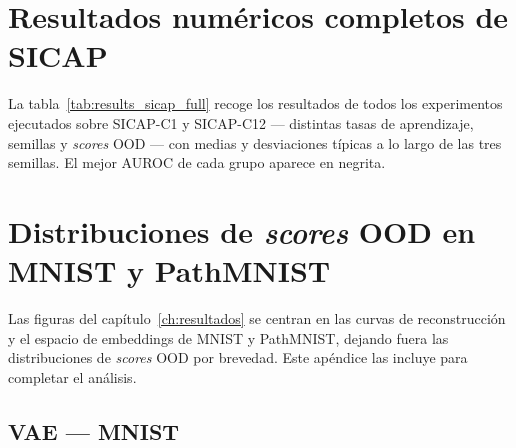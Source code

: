 

\chapter{Resultados numéricos completos de SICAP}
\label{apx:resultados-sicap}

La tabla~\ref{tab:results_sicap_full} recoge los resultados de todos los
experimentos ejecutados sobre SICAP-C1 y SICAP-C12 — distintas tasas de
aprendizaje, semillas y \textit{scores} OOD — con medias y desviaciones
típicas a lo largo de las tres semillas. El mejor AUROC de cada grupo aparece
en negrita.

\begin{table}[htbp]
    \caption{Resultados completos en SICAP: AUROC, AUPR y FPR@95\%
             (media~$\pm$~desv.\ típica). Mejor AUROC por grupo en negrita.}
    \label{tab:results_sicap_full}
    \centering
    \footnotesize
    
\end{table}


\chapter{Distribuciones de \textit{scores} OOD en MNIST y PathMNIST}
\label{apx:scores-mnist-path}

Las figuras del capítulo~\ref{ch:resultados} se centran en las curvas de
reconstrucción y el espacio de embeddings de MNIST y PathMNIST, dejando fuera
las distribuciones de \textit{scores} OOD por brevedad. Este apéndice las
incluye para completar el análisis.

\newcommand{\bestvaeM}{mlp_vae_mnist_s42_lr0.0001}
\newcommand{\bestddpmM}{mlp_ddpm_mnist_s42_lr0.0001_t10}
\newcommand{\bestvaeP}{mlp_vae_pathmnist_c1_s42_lr0.0001}
\newcommand{\bestddpmP}{mlp_ddpm_pathmnist_c1_s42_lr0.0001_t10}

\section{VAE --- MNIST}
\label{apx:vae-mnist}

